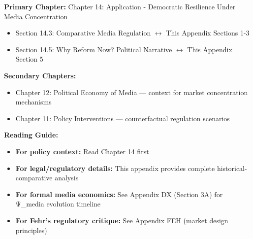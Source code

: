 \begin{tcolorbox}[colback=purple!5!white, colframe=purple!75!black,
    title=Chapter Linkage]

\textbf{Primary Chapter:} Chapter 14: Application - Democratic Resilience Under Media Concentration

\begin{itemize}[nosep]
\item Section 14.3: Comparative Media Regulation $\leftrightarrow$ This Appendix Sections 1-3
\item Section 14.5: Why Reform Now? Political Narrative $\leftrightarrow$ This Appendix Section 5
\end{itemize}

\textbf{Secondary Chapters:}
\begin{itemize}[nosep]
\item Chapter 12: Political Economy of Media --- context for market concentration mechanisms
\item Chapter 11: Policy Interventions --- counterfactual regulation scenarios
\end{itemize}

\textbf{Reading Guide:}
\begin{itemize}[nosep]
\item \textbf{For policy context:} Read Chapter 14 first
\item \textbf{For legal/regulatory details:} This appendix provides complete historical-comparative analysis
\item \textbf{For formal media economics:} See Appendix DX (Section 3A) for Ψ_media evolution timeline
\item \textbf{For Fehr's regulatory critique:} See Appendix FEH (market design principles)
\end{itemize}

\end{tcolorbox}



